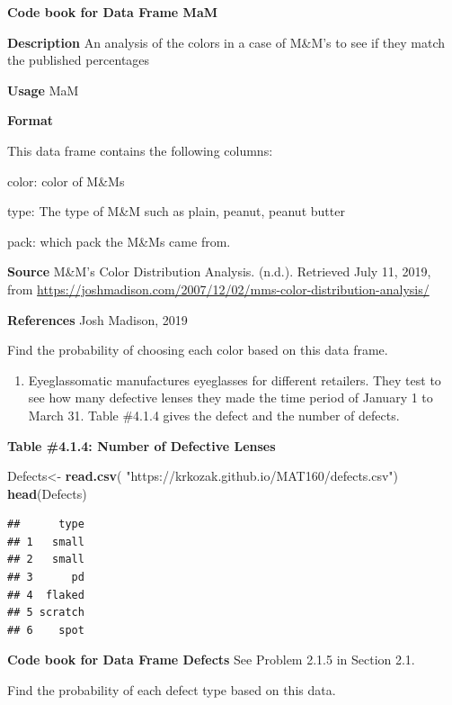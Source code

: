 \documentclass[
]{book}
\newenvironment{Shaded}{\begin{snugshade}}{\end{snugshade}}
\newcommand{\KeywordTok}[1]{\textcolor[rgb]{0.13,0.29,0.53}{\textbf{#1}}}
\newcommand{\NormalTok}[1]{#1}
\newcommand{\StringTok}[1]{\textcolor[rgb]{0.31,0.60,0.02}{#1}}
\providecommand{\tightlist}{%
  \setlength{\itemsep}{0pt}\setlength{\parskip}{0pt}}
\begin{document}
\textbf{Code book for Data Frame MaM}

\textbf{Description}
An analysis of the colors in a case of M\&M's to see if they match the published percentages

\textbf{Usage}
MaM

\textbf{Format}

This data frame contains the following columns:

color: color of M\&Ms

type: The type of M\&M such as plain, peanut, peanut butter

pack: which pack the M\&Ms came from.

\textbf{Source}
M\&M's Color Distribution Analysis. (n.d.). Retrieved July 11, 2019, from \url{https://joshmadison.com/2007/12/02/mms-color-distribution-analysis/}

\textbf{References}
Josh Madison, 2019

Find the probability of choosing each color based on this data frame.

\begin{enumerate}
\def\labelenumi{\arabic{enumi}.}
\setcounter{enumi}{1}
\tightlist
\item
  Eyeglassomatic manufactures eyeglasses for different retailers. They test to see how many defective lenses they made the time period of January 1 to March 31. Table \#4.1.4 gives the defect and the number
  of defects.
\end{enumerate}

\textbf{Table \#4.1.4: Number of Defective Lenses}

\begin{Shaded}
\begin{Highlighting}[]
\NormalTok{Defects<-}\StringTok{ }\KeywordTok{read.csv}\NormalTok{(}
  \StringTok{"https://krkozak.github.io/MAT160/defects.csv"}\NormalTok{) }
\KeywordTok{head}\NormalTok{(Defects)}
\end{Highlighting}
\end{Shaded}

\begin{verbatim}
##      type
## 1   small
## 2   small
## 3      pd
## 4  flaked
## 5 scratch
## 6    spot
\end{verbatim}

\textbf{Code book for Data Frame Defects} See Problem 2.1.5 in Section 2.1.

Find the probability of each defect type based on this data.
\end{document}
